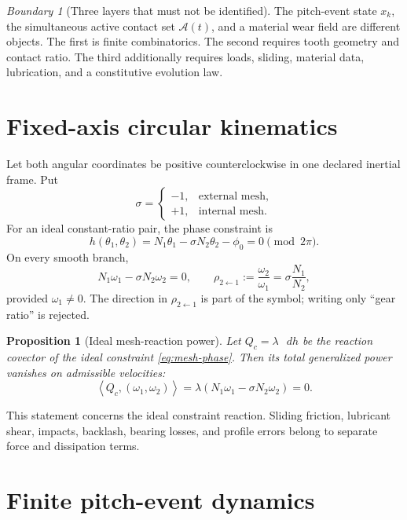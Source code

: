 \documentclass[11pt,a4paper]{article}
\theoremstyle{definition}
\theoremstyle{plain}
\newtheorem{proposition}[definition]{Proposition}
\theoremstyle{remark}
\newtheorem{warning}[definition]{Boundary}
\newcommand{\dd}{\mathop{}\!d}
\newcommand{\pair}[2]{\left\langle #1,#2\right\rangle}
\newcommand{\Acal}{\mathcal A}
\begin{document}
\begin{warning}[Three layers that must not be identified]
The pitch-event state \(x_k\), the simultaneous active contact set
\(\Acal(t)\), and a material wear field are different objects. The
first is finite combinatorics. The second requires tooth geometry and
contact ratio. The third additionally requires loads, sliding,
material data, lubrication, and a constitutive evolution law.
\end{warning}

\section{Fixed-axis circular kinematics}

Let both angular coordinates be positive counterclockwise in one
declared inertial frame. Put
\[
\sigma=
\begin{cases}
-1,&\text{external mesh},\\
+1,&\text{internal mesh}.
\end{cases}
\]
For an ideal constant-ratio pair, the phase constraint is
\begin{equation}\label{eq:mesh-phase}
h(\theta_1,\theta_2)
=N_1\theta_1-\sigma N_2\theta_2-\phi_0
=0\pmod{2\pi}.
\end{equation}
On every smooth branch,
\begin{equation}\label{eq:mesh-velocity}
N_1\omega_1-\sigma N_2\omega_2=0,\qquad
\rho_{2\leftarrow1}
:=\frac{\omega_2}{\omega_1}
=\sigma\frac{N_1}{N_2},
\end{equation}
provided \(\omega_1\ne0\). The direction in
\(\rho_{2\leftarrow1}\) is part of the symbol; writing only ``gear
ratio'' is rejected.

\begin{proposition}[Ideal mesh-reaction power]\label{prop:ideal-power}
Let \(Q_c=\lambda\,\dd h\) be the reaction covector of the ideal
constraint \cref{eq:mesh-phase}. Then its total generalized power
vanishes on admissible velocities:
\[
\pair{Q_c}{(\omega_1,\omega_2)}
=\lambda(N_1\omega_1-\sigma N_2\omega_2)=0.
\]
\end{proposition}

This statement concerns the ideal constraint reaction. Sliding
friction, lubricant shear, impacts, backlash, bearing losses, and
profile errors belong to separate force and dissipation terms.

\section{Finite pitch-event dynamics}
\end{document}
